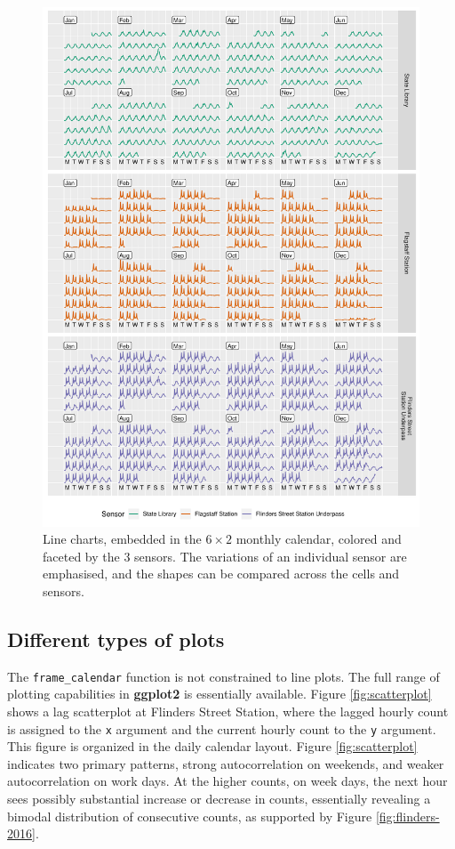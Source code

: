 \documentclass[12pt]{article}
\begin{document}
\begin{figure}

{\centering \includegraphics[width=\textwidth]{figure/facet-1} 

}

\caption{Line charts, embedded in the $6 \times 2$ monthly calendar, colored and faceted by the 3 sensors. The variations of an individual sensor are emphasised, and the shapes can be compared across the cells and sensors.}\label{fig:facet}
\end{figure}

\hypertarget{different-types-of-plots}{%
\subsection{Different types of plots}\label{different-types-of-plots}}

The \texttt{frame\_calendar} function is not constrained to line plots.
The full range of plotting capabilities in \textbf{ggplot2} is
essentially available. Figure \ref{fig:scatterplot} shows a lag
scatterplot at Flinders Street Station, where the lagged hourly count is
assigned to the \texttt{x} argument and the current hourly count to the
\texttt{y} argument. This figure is organized in the daily calendar
layout. Figure \ref{fig:scatterplot} indicates two primary patterns,
strong autocorrelation on weekends, and weaker autocorrelation on work
days. At the higher counts, on week days, the next hour sees possibly
substantial increase or decrease in counts, essentially revealing a
bimodal distribution of consecutive counts, as supported by Figure
\ref{fig:flinders-2016}.
\end{document}
